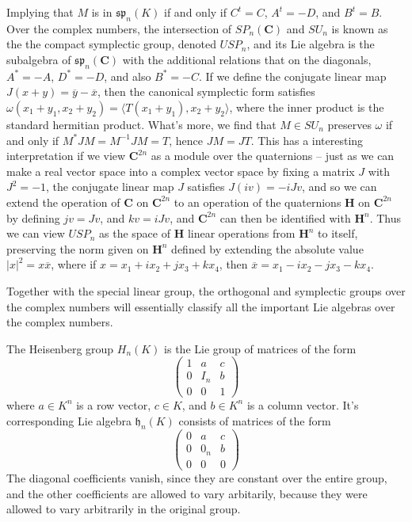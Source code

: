 \begin{example}
\begin{itemize}
        Implying that $M$ is in $\mathfrak{sp}_n(K)$ if and only if $C^t = C$, $A^t= -D$, and $B^t = B$. Over the complex numbers, the intersection of $SP_n(\mathbf{C})$ and $SU_n$ is known as the the compact symplectic group, denoted $USP_n$, and its Lie algebra is the subalgebra of $\mathfrak{sp}_n(\mathbf{C})$ with the additional relations that on the diagonals, $A^* = -A$, $D^* = -D$, and also $B^* = -C$. If we define the conjugate linear map $J(x + y) = \overline{y} - \overline{x}$, then the canonical symplectic form satisfies $\omega(x_1 + y_1,x_2 + y_2) = \langle T(x_1 + y_1), x_2 + y_2 \rangle$, where the inner product is the standard hermitian product. What's more, we find that $M \in SU_n$ preserves $\omega$ if and only if $M^*JM = M^{-1}JM = T$, hence $JM = JT$. This has a interesting interpretation if we view $\mathbf{C}^{2n}$ as a module over the quaternions -- just as we can make a real vector space into a complex vector space by fixing a matrix $J$ with $J^2 = -1$, the conjugate linear map $J$ satisfies $J(iv) = -iJv$, and so we can extend the operation of $\mathbf{C}$ on $\mathbf{C}^{2n}$ to an operation of the quaternions $\mathbf{H}$ on $\mathbf{C}^{2n}$ by defining $jv = Jv$, and $kv = iJv$, and $\mathbf{C}^{2n}$ can then be identified with $\mathbf{H}^n$. Thus we can view $USP_n$ as the space of $\mathbf{H}$ linear operations from $\mathbf{H}^n$ to itself, preserving the norm given on $\mathbf{H}^n$ defined by extending the absolute value $|x|^2 = x\overline{x}$, where if $x = x_1 + ix_2 + jx_3 + kx_4$, then $\overline{x} = x_1 - ix_2 - jx_3 - kx_4$.
    \end{itemize}
    Together with the special linear group, the orthogonal and symplectic groups over the complex numbers will essentially classify all the important Lie algebras over the complex numbers.
\end{example}

\begin{example}
    The Heisenberg group $H_n(K)$ is the Lie group of matrices of the form
    \[ \begin{pmatrix} 1 & a & c \\ 0 & I_n & b \\ 0 & 0 & 1 \end{pmatrix} \]
    where $a \in K^n$ is a row vector, $c \in K$, and $b \in K^n$ is a column vector. It's corresponding Lie algebra $\mathfrak{h}_n(K)$ consists of matrices of the form
    \[ \begin{pmatrix} 0 & a & c \\ 0 & 0_n & b \\ 0 & 0 & 0 \end{pmatrix} \]
    The diagonal coefficients vanish, since they are constant over the entire group, and the other coefficients are allowed to vary arbitarily, because they were allowed to vary arbitrarily in the original group.
\end{example}

